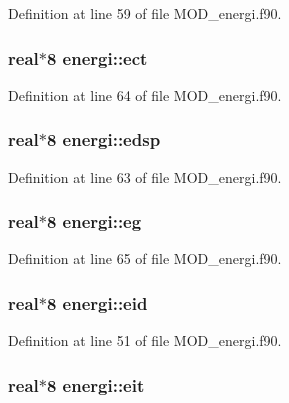 Definition at line 59 of file M\-O\-D\-\_\-energi.\-f90.

\hypertarget{classenergi_a8a7db8c40cadd4fb010504fdad89ec38}{
\subsubsection[{ect}]{\setlength{\rightskip}{0pt plus 5cm}real$\ast$8 energi\-::ect}}\label{classenergi_a8a7db8c40cadd4fb010504fdad89ec38}


Definition at line 64 of file M\-O\-D\-\_\-energi.\-f90.

\hypertarget{classenergi_af8d9779b268ab2146182f415ea3b3e43}{
\subsubsection[{edsp}]{\setlength{\rightskip}{0pt plus 5cm}real$\ast$8 energi\-::edsp}}\label{classenergi_af8d9779b268ab2146182f415ea3b3e43}


Definition at line 63 of file M\-O\-D\-\_\-energi.\-f90.

\hypertarget{classenergi_ac3a05d45c734d9ea73049e25f5d0e3ec}{
\subsubsection[{eg}]{\setlength{\rightskip}{0pt plus 5cm}real$\ast$8 energi\-::eg}}\label{classenergi_ac3a05d45c734d9ea73049e25f5d0e3ec}


Definition at line 65 of file M\-O\-D\-\_\-energi.\-f90.

\hypertarget{classenergi_a1a27b071ba10506e864bf6ffd548a3ee}{
\subsubsection[{eid}]{\setlength{\rightskip}{0pt plus 5cm}real$\ast$8 energi\-::eid}}\label{classenergi_a1a27b071ba10506e864bf6ffd548a3ee}


Definition at line 51 of file M\-O\-D\-\_\-energi.\-f90.

\hypertarget{classenergi_a2472305c8df1e292032c51061c895cea}{
\subsubsection[{eit}]{\setlength{\rightskip}{0pt plus 5cm}real$\ast$8 energi\-::eit}}\label{classenergi_a2472305c8df1e292032c51061c895cea}


